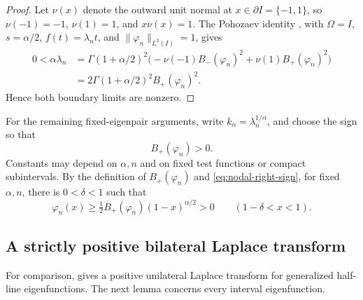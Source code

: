 \documentclass[11pt]{amsart}
\numberwithin{equation}{section}
\theoremstyle{remark}
\newcommand{\norm}[2][]{\lVert #2\rVert_{#1}}
\begin{document}
\begin{proof}
Let $\nu(x)$ denote the outward unit normal at
$x\in\partial I=\{-1,1\}$, so $\nu(-1)=-1$, $\nu(1)=1$, and $x\nu(x)=1$.
The Pohozaev identity \cite[Theorem~1.1]{RosOtonSerraPohozaev},
with $\Omega=I$, $s=\alpha/2$, $f(t)=\lambda_nt$, and
$\norm[L^2(I)]{\varphi_n}=1$, gives
\[
 \begin{aligned}
 0<\alpha\lambda_n
 &=\Gamma(1+\alpha/2)^2
   \bigl(-\nu(-1)B_-(\varphi_n)^2+\nu(1)B_+(\varphi_n)^2\bigr)\\
 &=2\Gamma(1+\alpha/2)^2B_+(\varphi_n)^2.
 \end{aligned}
\]
Hence both boundary limits are nonzero.
\end{proof}

For the remaining fixed-eigenpair arguments, write $k_n=\lambda_n^{1/\alpha}$, and choose the sign so that
\begin{equation}\label{eq:nodal-right-sign}
 B_+(\varphi_n)>0.
\end{equation}
Constants may depend on $\alpha,n$ and on fixed test functions or compact
subintervals. By the definition of $B_+(\varphi_n)$ and
\eqref{eq:nodal-right-sign},
 for fixed $\alpha,n$, there is $0<\delta<1$ such that
\begin{equation}\label{eq:nodal-right-positive}
 \varphi_n(x)\ge\tfrac12B_+(\varphi_n)(1-x)^{\alpha/2}>0
 \qquad(1-\delta<x<1).
\end{equation}

\subsection{A strictly positive bilateral Laplace transform}
\label{subsec:nodal-laplace}

For comparison, \cite[Theorem~1.1, formula~(1.1)]{KwasnickiHalfLine}
gives a positive unilateral Laplace transform for generalized half-line
eigenfunctions. The next lemma concerns every interval eigenfunction.
\end{document}
